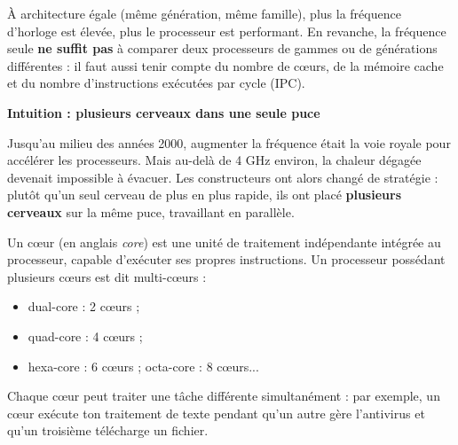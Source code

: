 \documentclass[11pt]{article}
\newcommand{\cle}[1]{{\popxbold\color{popdark}#1}}
\newcounter{popsec}
\newcounter{popsub}
\newcommand{\courssub}[1]{%
  \stepcounter{popsub}%
  \par\vspace{9pt}\noindent{\popxbold\fontsize{11.5}{13}\selectfont\color{popink}{\color{poporange}\thepopsec.\thepopsub}\hspace{6pt}#1}\par\nopagebreak\vspace{4pt}
}
\begin{document}
\begin{propriete}
À architecture égale (même génération, même famille), plus la fréquence d'horloge est élevée, plus le processeur est performant. En revanche, la fréquence seule \textbf{ne suffit pas} à comparer deux processeurs de gammes ou de générations différentes : il faut aussi tenir compte du nombre de cœurs, de la mémoire cache et du nombre d'instructions exécutées par cycle (IPC).
\end{propriete}

\courssub{Le nombre de cœurs}

\textbf{Intuition : plusieurs cerveaux dans une seule puce}\par

Jusqu'au milieu des années 2000, augmenter la fréquence était la voie royale pour accélérer les processeurs. Mais au-delà de 4 GHz environ, la chaleur dégagée devenait impossible à évacuer. Les constructeurs ont alors changé de stratégie : plutôt qu'un seul cerveau de plus en plus rapide, ils ont placé \textbf{plusieurs cerveaux} sur la même puce, travaillant en parallèle.

\begin{definition}[Cœur]
Un \cle{cœur} (en anglais \emph{core}) est une \cle{unité de traitement indépendante} intégrée au processeur, capable d'exécuter ses propres instructions. Un processeur possédant plusieurs cœurs est dit \cle{multi-cœurs} :
\begin{itemize}
\item \cle{dual-core} : 2 cœurs ;
\item \cle{quad-core} : 4 cœurs ;
\item \cle{hexa-core} : 6 cœurs ; \cle{octa-core} : 8 cœurs...
\end{itemize}
Chaque cœur peut traiter une tâche différente simultanément : par exemple, un cœur exécute ton traitement de texte pendant qu'un autre gère l'antivirus et qu'un troisième télécharge un fichier.
\end{definition}
\end{document}

